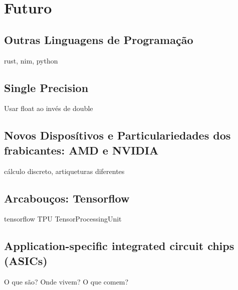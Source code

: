 \chapter{Futuro}
\label{cap:futuro}

\section{Outras Linguagens de Programação}
  rust, nim, python

\section{Single Precision}
  Usar float ao invés de double

\section{Novos Disposítivos e Particulariedades dos frabicantes: AMD e NVIDIA}
  cálculo discreto, artiqueturas diferentes

\section{Arcabouços: Tensorflow}
  tensorflow
  TPU TensorProcessingUnit

\section{Application-specific integrated circuit chips (ASICs)}
  O que são? Onde vivem? O que comem?
